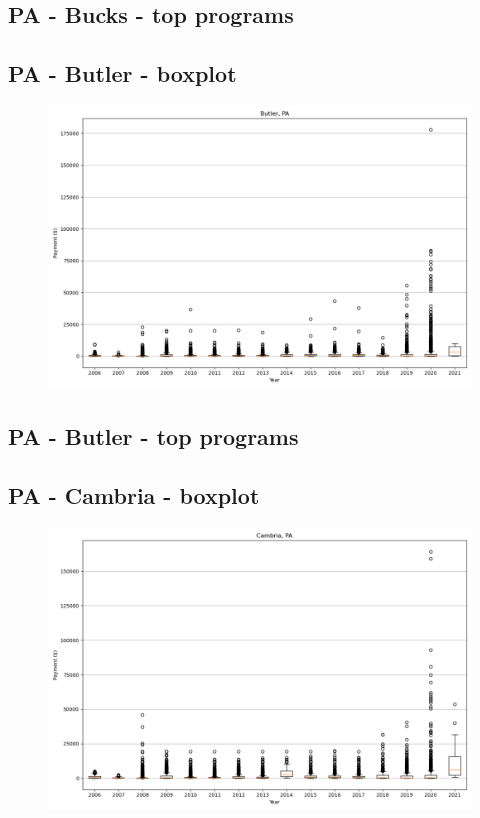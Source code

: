 \subsection*{PA - Bucks - top programs}

\newpage
\subsection*{PA - Butler - boxplot}
\begin{figure}[h]
\centering
\includegraphics[width=7in]{../output/boxplots/counties/Butler-PA_boxplot.png}
\end{figure}


\subsection*{PA - Butler - top programs}

\newpage
\subsection*{PA - Cambria - boxplot}
\begin{figure}[h]
\centering
\includegraphics[width=7in]{../output/boxplots/counties/Cambria-PA_boxplot.png}
\end{figure}


